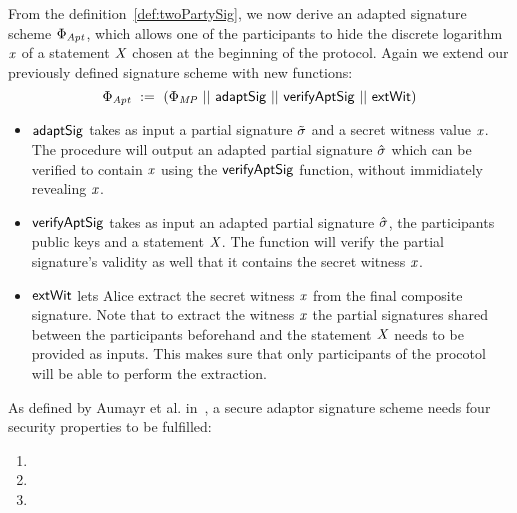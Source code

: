 \begin{definition}
    \label{def:twoPartyFixedWitAptSig}
    From the definition~\ref{def:twoPartySig}, we now derive an adapted signature scheme $\Phi_{\mathit{Apt}}$, which allows one of the participants to hide the discrete logarithm $\mathit{x}$ of a statement $\mathit{X}$ chosen
    at the beginning of the protocol. Again we extend our previously defined signature scheme with new functions:
    \[ \Phi_{\mathit{Apt}} ~:=~ (\Phi_{\mathit{MP}} ~||~ \mathsf{adaptSig} ~||~ \mathsf{verifyAptSig} ~||~ \mathsf{extWit}) \]
    \begin{itemize}
        \item $\mathsf{adaptSig}$ takes as input a partial signature $\tilde{\sigma}$ and a secret witness value $\mathit{x}$. The procedure will output an adapted partial signature $\hat{\sigma}$ which can be verified to contain $\mathit{x}$ using the $\mathsf{verifyAptSig}$ function, without immidiately revealing $\mathit{x}$.
        \item $\mathsf{verifyAptSig}$ takes as input an adapted partial signature $\hat{\sigma}$, the participants public keys and a statement $\mathit{X}$. The function will verify the partial signature's validity as well that it contains the secret witness $\mathit{x}$.
        \item $\mathsf{extWit}$ lets Alice extract the secret witness $\mathit{x}$ from the final composite signature. Note that to extract the witness $\mathit{x}$ the partial signatures shared between the participants beforehand and the statement $\mathit{X}$ needs to be provided as inputs. This makes sure that only participants of the procotol will be able to perform the extraction.
    \end{itemize}
\end{definition}

\begin{definition}
    As defined by Aumayr et al. in~\cite{aumayr2020bitcoinchannels}, a secure adaptor signature scheme needs four security properties to be fulfilled:
    \begin{enumerate}
        \item \cnstAptSigCorrectness
        \item \cnstaEUFCMA
        \item \cnstWitnessExtractability
    \end{enumerate}
\end{definition}

